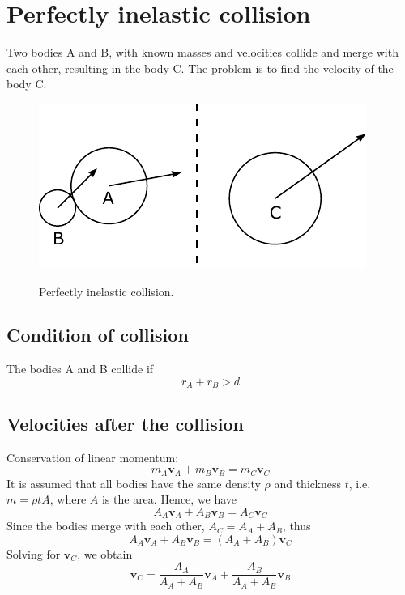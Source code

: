 \documentclass{article}
\newcommand{\vbs}[0]{\boldsymbol{v}}
\begin{document}
\section{Perfectly inelastic collision}
Two bodies A and B, with known masses and velocities collide and merge with each other, resulting in the body C. The problem is to find the velocity of the body C.

\begin{figure}[h]
	\centering
	{\includegraphics{figures/perfectly_inelastic_collision.pdf}}
	\caption{Perfectly inelastic collision.}\label{fig:perfectly_inelastic_collision}
\end{figure}

\subsection{Condition of collision}
The bodies A and B collide if
\begin{equation}
r_A + r_B > d
\end{equation}

\subsection{Velocities after the collision}

Conservation of linear momentum:
\begin{equation*}
m_A\vbs_A + m_B\vbs_B = m_C\vbs_C
\end{equation*}
It is assumed that all bodies have the same density $\rho$ and thickness $t$, i.e. $m = \rho t A$, where $A$ is the area. Hence, we have
\begin{equation*}
A_A\vbs_A + A_B\vbs_B = A_C\vbs_C
\end{equation*}
Since the bodies merge with each other, $A_C = A_A + A_B$, thus
\begin{equation*}
A_A\vbs_A + A_B\vbs_B = (A_A + A_B)\vbs_C
\end{equation*}
Solving for $\vbs_C$, we obtain
\begin{equation}
\label{eq:perfectly_inelastic_collision}
\vbs_C = \frac{A_A}{A_A + A_B}\vbs_A + \frac{A_B}{A_A + A_B}\vbs_B
\end{equation}
\end{document}
